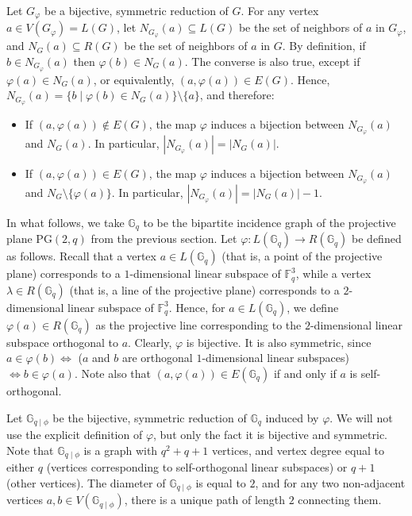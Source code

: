 \documentclass[10pt,a4paper]{article}
\newcommand{\G}[1][q]{\mathbb{G}_{#1}}
\newcommand{\Gphi}[1][q]{\mathbb{G}_{#1\mid\phi}}
\begin{document}
\medskip Let $G_\varphi$ be a bijective, symmetric reduction of $G$. For any vertex $a\in V(G_\varphi) = L(G)$, let $N_{G_\varphi}(a) \subseteq L(G)$ be the set of neighbors of $a$ in $G_\varphi$, and $N_{G}(a) \subseteq R(G)$ be the set of neighbors of $a$ in $G$. By definition, if $b\in N_{G_\varphi}(a)$ then $\varphi(b)\in N_{G}(a)$. The converse is also true, except if $\varphi(a)\in N_{G}(a)$, or equivalently, $(a,\varphi(a)) \in E(G)$. Hence, $N_{G_\varphi}(a)  = 
    \{b \mid  \varphi(b) \in N_{G}(a)\} \setminus \{a\}$, and therefore:
\begin{itemize}
    \item If $(a,\varphi(a)) \not\in E(G)$, the map $\varphi$ induces a bijection between $N_{G_\varphi}(a)$ and $N_{G}(a)$. In particular,  $|N_{G_\varphi}(a)| =  |N_{G}(a)|$.
    \item If $(a,\varphi(a)) \in E(G)$, the map  $\varphi$ induces a bijection between $N_{G_\varphi}(a)$ and $N_{G}\setminus \{\varphi(a)\}$. In particular, $|N_{G_\varphi}(a)| =  |N_{G}(a)|-1$.
\end{itemize}

In what follows, we take $\G$ to be the bipartite incidence graph of the projective plane $\mbox{PG}(2,q)$ from the previous section. Let $\varphi: L(\G) \rightarrow R(\G)$   be defined as follows. Recall that a vertex $a\in L(\G)$ (that is, a point of the projective plane) corresponds to a $1$-dimensional linear subspace of  $\mathbb{F}_q^3$, while a vertex $\lambda\in R(\G)$ (that is, a line of the projective plane) corresponds to a $2$-dimensional linear subspace of  $\mathbb{F}_q^3$. Hence, for $a\in L(\G)$, we define $\varphi(a) \in R(\G)$ as the projective line corresponding to the $2$-dimensional linear subspace orthogonal to $a$. Clearly, $\varphi$ is bijective. It is also symmetric, since $a\in \varphi(b) \Leftrightarrow$ ($a$ and $b$ are orthogonal $1$-dimensional linear subspaces) $\Leftrightarrow b\in \varphi(a)$. Note also that  $(a, \varphi(a))\in E(\G)$ if and only if  $a$ is self-orthogonal. 

Let $\Gphi$   be the bijective, symmetric reduction of $\G$ induced by $\varphi$. We will not use the explicit definition of $\varphi$, but only the fact it is bijective and symmetric. Note that $\Gphi$ is a graph with $q^2+q+1$ vertices, and vertex degree equal to either $q$ (vertices corresponding to self-orthogonal linear subspaces) or $q+1$ (other vertices). The diameter of $\Gphi$ is equal to $2$, and for any two non-adjacent vertices $a, b\in V(\Gphi)$, there is a unique path of length $2$ connecting them.
\end{document}
